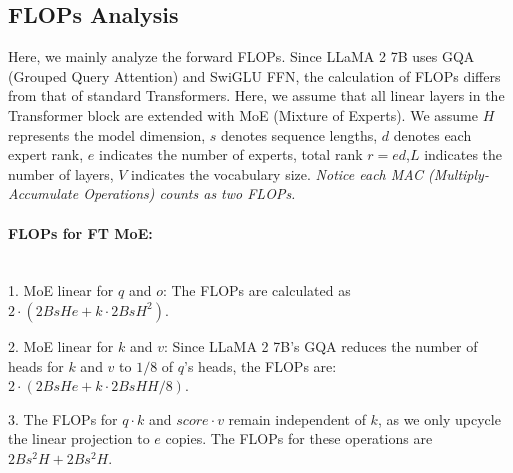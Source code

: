 





\subsection{FLOPs Analysis} \label{app:flops}
Here, we mainly analyze the forward FLOPs. 
Since LLaMA 2 7B uses GQA (Grouped Query Attention) and SwiGLU FFN, the calculation of FLOPs differs from that of standard Transformers. Here, we assume that all linear layers in the Transformer block are extended with MoE (Mixture of Experts). We assume \( H \) represents the model dimension, \(s\) denotes sequence lengths, \( d \) denotes each expert rank, \( e \) indicates the number of experts, total rank \(r = ed\),\( L \) indicates the number of layers, \( V \) indicates the vocabulary size. \textit{Notice each MAC (Multiply-Accumulate Operations) counts as two FLOPs.}

\paragraph{FLOPs for FT MoE:\\ \\} 

1. MoE linear for \(q\) and \(o\): 
   The FLOPs are calculated as \(2 \cdot ( 2BsHe + k \cdot 2BsH^2)\).

2. MoE linear for \(k\) and \(v\): 
   Since LLaMA 2 7B's GQA reduces the number of heads for \(k\) and \(v\) to \(1/8\) of \(q\)'s heads, the FLOPs are:  
   \(2 \cdot (2BsHe + k \cdot 2BsHH/8)\).

3. The FLOPs for \(q \cdot k\) and \(score \cdot v\) remain independent of $k$, as we only upcycle the linear projection to \(e\) copies. The FLOPs for these operations are \(2Bs^2H + 2Bs^2H\).

